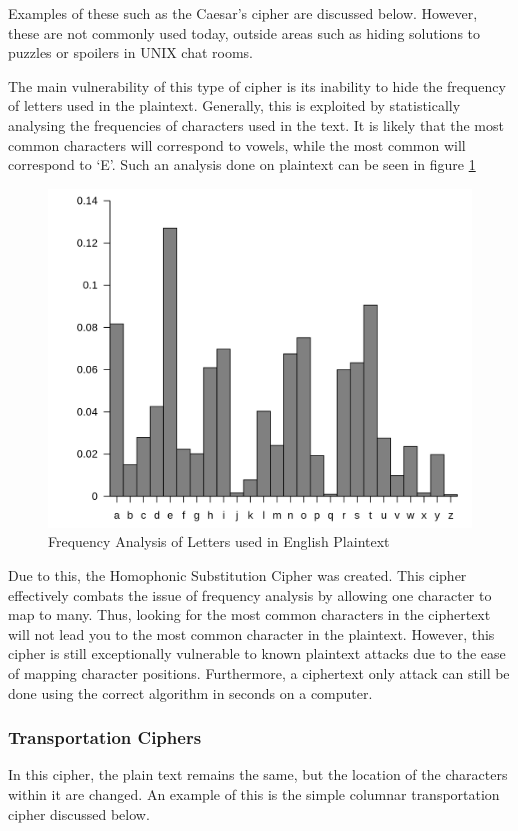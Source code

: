 				Examples of these such as the Caesar's cipher are discussed below.
				However, these are not commonly used today, outside areas such as hiding solutions to puzzles or spoilers in UNIX chat rooms.

				The main vulnerability of this type of cipher is its inability to hide the frequency of letters used in the plaintext.
				Generally, this is exploited by statistically analysing the frequencies of characters used in the text.
				It is likely that the most common characters will correspond to vowels, while the most common will correspond to `E'.
				Such an analysis done on plaintext can be seen in figure \ref{fig:LetterFreq}
				\begin{figure}[htb]
					\centering
					\includegraphics[scale=0.2]{./letterFreq.png}
					\caption{Frequency Analysis of Letters used in English Plaintext}
					\label{fig:LetterFreq}
				\end{figure}

				Due to this, the Homophonic Substitution Cipher was created.
				This cipher effectively combats the issue of frequency analysis by allowing one character to map to many.
				Thus, looking for the most common characters in the ciphertext will not lead you to the most common character in the plaintext.
				However, this cipher is still exceptionally vulnerable to known plaintext attacks due to the ease of mapping character positions.
				Furthermore, a ciphertext only attack can still be done using the correct algorithm in seconds on a computer.
			\subsubsection{Transportation Ciphers}
				In this cipher, the plain text remains the same, but the location of the characters within it are changed.
				An example of this is the simple columnar transportation cipher discussed below.

